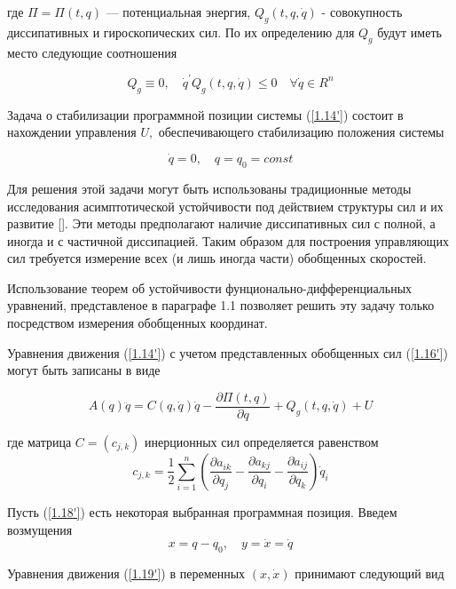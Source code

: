  где $\Pi = \Pi(t, q)$ --- потенциальная энергия, $Q_g(t, q, \dot q)$ - совокупность диссипативных и гироскопических сил. По их определению для $Q_g$ будут иметь место следующие соотношения
 
 \begin{equation} \label{1.17'}
   Q_g \equiv 0, \quad \dot q^{'} Q_g (t, q, \dot q) \le 0 \quad \forall \dot q \in R^n
 \end{equation}
 
Задача о стабилизации программной позиции системы (\ref{1.14'}) состоит в нахождении управления $U,$ обеспечивающего стабилизацию положения системы 

\begin{equation} \label{1.18'}
\dot q = 0, \quad q = q_0 = const
\end{equation}

Для решения этой задачи могут быть использованы традиционные методы исследования асимптотической устойчивости под действием структуры сил и их развитие []. Эти методы предполагают наличие диссипативных сил с полной, а иногда и с частичной диссипацией. Таким образом для построения управляющих сил требуется измерение всех (и лишь иногда части) обобщенных скоростей. 

Использование теорем об устойчивости фунционально-дифференциальных уравнений, представленое в параграфе 1.1 позволяет решить эту задачу только посредством измерения обобщенных координат.

Уравнения движения (\ref{1.14'}) с учетом представленных обобщенных сил (\ref{1.16'}) могут быть записаны в виде 

 \begin{equation} \label{1.19'}
 A(q) \ddot q = C(q, \dot q) \dot q - \frac{\partial \Pi(t, q)}{\partial q} + Q_g(t, q, \dot q) + U
 \end{equation}

 где матрица $C = (c_{j,k})$ инерционных сил определяется равенством 
 $$c_{j,k} = \frac12 \sum\limits_{i =1}^{n} (\frac{\partial a_{ik} } {\partial q_j} - \frac{\partial a_{kj}}{\partial q_i} - \frac{\partial a_{ij}}{\partial q_k}) \dot q_i$$

Пусть (\ref{1.18'}) есть некоторая выбранная программная позиция. Введем возмущения
\begin{equation} \label{1.20'}
x = q - q_0, \quad y = \dot x = \dot q
\end{equation}
 
Уравнения движения (\ref{1.19'}) в переменных $(x, \dot x)$ принимают следующий вид 

